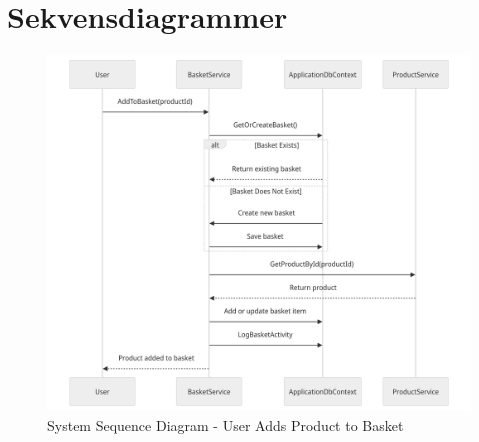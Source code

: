 \section{Sekvensdiagrammer}
\label{appendix:sequence-diagrams}
\begin{figure}
    \centering
    \includegraphics[width=1\textwidth]{figures/diagrams/ssd-user-adds-product-to-basket.png}
    \caption{System Sequence Diagram - User Adds Product to Basket}
    \label{fig:ssd-user-adds-product-to-basket}
\end{figure}
